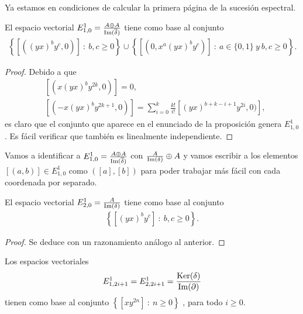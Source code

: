 \documentclass[fleqn,../tesis.tex]{subfiles}
\begin{document}
Ya estamos en condiciones de calcular la primera página de la sucesión espectral. 
\begin{prop}
	El espacio vectorial $E_{1,0}^1 = \frac{A \oplus A}{\operatorname{Im}(\overline{\delta})}$
	tiene como base al conjunto
	\begin{align*}
		\left\{ \left[((yx)^by^c, 0)\right]\ :\ b,c \geq 0\right\}
			\cup \left\{ \left[(0, x^a(yx)^by^c)\right]\ :\ a \in \{0, 1\}\ y\ b,c \geq 0\right\}. 
	\end{align*}
\end{prop}
\begin{proof}
	Debido a que
	\begin{align*}
		&\left[(x(yx)^by^{2k}, 0)\right] = 0, \\
		&\left[(-x(yx)^by^{2k + 1}, 0)\right] = \sum_{i = 0}^{k}\frac{k!}{i!}\left[(yx)^{b + k - i + 1}y^{2i}, 0)\right],
	\end{align*}
	es claro que el conjunto que aparece en el enunciado de la proposición genera $E_{1, 0}^1$. Es fácil verificar
	que también es linealmente independiente.
\end{proof}
Vamos a identificar a $E_{1,0}^1 = \frac{A \oplus A}{\operatorname{Im}(\overline{\delta})}$ con $\frac{A}{\operatorname{Im}(\delta)} \oplus A$
y vamos escribir a los elementos $\left[\left(a, b\right)\right] \in E_{1,0}^1$ como $\left(\left[a\right], \left[b\right]\right)$ para poder
trabajar más fácil con cada coordenada por separado.
\begin{prop}
	El espacio vectorial $E_{2,0}^1 = \frac{A}{\operatorname{Im}(\delta)}$ tiene como base al conjunto
	\begin{align*}
		\left\{ \left[(yx)^by^c\right] \ :\ b,c \geq 0\right\}. 
	\end{align*}
\end{prop}
\begin{proof}
	Se deduce con un razonamiento análogo al anterior.
\end{proof}
\begin{prop}
	Los espacios vectoriales
	\begin{align*}
		E_{1,2i + 1}^1 = E_{2, 2i + 1}^1 = \frac{\operatorname{Ker}(\delta)}{\operatorname{Im}(\partial)}
	\end{align*}
	tienen como base al conjunto $\left\{ \left[xy^{2n}\right] \ :\ n \geq 0\right\}$ , para todo $i \geq 0$.
\end{prop}
\end{document}
